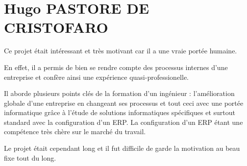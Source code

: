 \section{Hugo PASTORE DE CRISTOFARO}

Ce projet était intéressant et très motivant car il a une vraie portée humaine.

En effet, il a permis de bien se rendre compte des processus internes d'une 
entreprise et confère ainsi une expérience quasi-professionelle. 

Il aborde plusieurs points clés de la formation d'un ingénieur : l'amélioration 
globale d'une entreprise en changeant ses processus et tout ceci avec une portée 
informatique grâce à l'étude de solutions informatiques spécifiques et surtout 
standard avec la configuration d'un ERP. La configuration d'un ERP étant une 
compétence très chère sur le marché du travail.

Le projet était cependant long et il fut difficile de garde la motivation au 
beau fixe tout du long.
